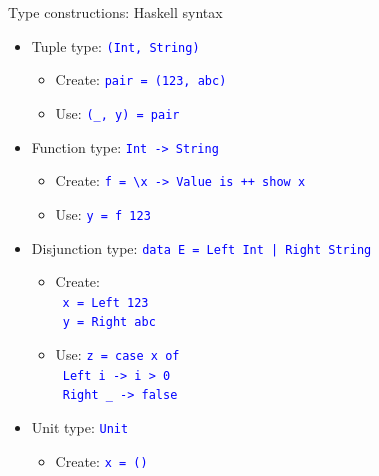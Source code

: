 \documentclass[english]{beamer}
\begin{document}
\begin{frame}{Type constructions: Haskell syntax}

\begin{itemize}
\item Tuple type: \texttt{\textcolor{blue}{\footnotesize{}(Int, String)}}{\footnotesize \par}
\begin{itemize}
\item Create: \texttt{\textcolor{blue}{\footnotesize{}pair = (123, \textquotedbl{}abc\textquotedbl{})}} 
\item Use: \texttt{\textcolor{blue}{\footnotesize{}(\_, y) = pair}}{\footnotesize \par}
\end{itemize}
\item Function type: \texttt{\textcolor{blue}{\footnotesize{}Int -> String}}{\footnotesize \par}
\begin{itemize}
\item Create: \texttt{\textcolor{blue}{\footnotesize{}f = \textbackslash{}x
-> \textquotedbl{}Value is \textquotedbl{} ++ show x}} 
\item Use: \texttt{\textcolor{blue}{\footnotesize{}y = f 123}}{\footnotesize \par}
\end{itemize}
\item Disjunction type: \texttt{\textcolor{blue}{\footnotesize{}data E =
Left Int | Right String}}{\footnotesize \par}
\begin{itemize}
\item Create:\\
\  \texttt{\textcolor{blue}{\footnotesize{}x = Left 123}}~\\
\texttt{\textcolor{blue}{\footnotesize{} y = Right \textquotedbl{}abc\textquotedbl{}}}{\footnotesize \par}
\item Use: \texttt{\textcolor{blue}{\footnotesize{}z = case x of}}~\\
\texttt{\textcolor{blue}{\footnotesize{} Left i -> i > 0}}~\\
\texttt{\textcolor{blue}{\footnotesize{} Right \_ -> false}}~\\
{\footnotesize \par}
\end{itemize}
\item Unit type: \texttt{\textcolor{blue}{\footnotesize{}Unit}}{\footnotesize \par}
\begin{itemize}
\item Create: \texttt{\textcolor{blue}{\footnotesize{}x = ()}}{\footnotesize \par}
\end{itemize}
\end{itemize}
\end{frame}
\end{document}
